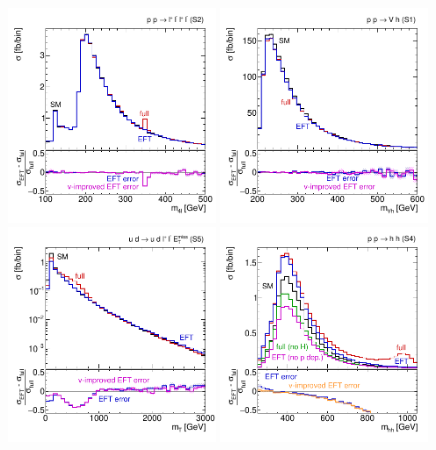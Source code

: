 \begin{figure}
  \includegraphics[width=0.49\textwidth,clip=true,trim=0 0.2cm 0 0.2cm]{fig/validity/Singlet_4l.pdf}%
  \includegraphics[width=0.49\textwidth,clip=true,trim=0 0.2cm 0 0.2cm]{fig/validity/Singlet_VH.pdf}\\%
  \includegraphics[width=0.49\textwidth,clip=true,trim=0 0.2cm 0 0.2cm]{fig/validity/Singlet_WBF.pdf}%
  \includegraphics[width=0.49\textwidth,clip=true,trim=0 0.2cm 0 0.2cm]{fig/validity/Singlet_HH.pdf}%

\end{figure}
